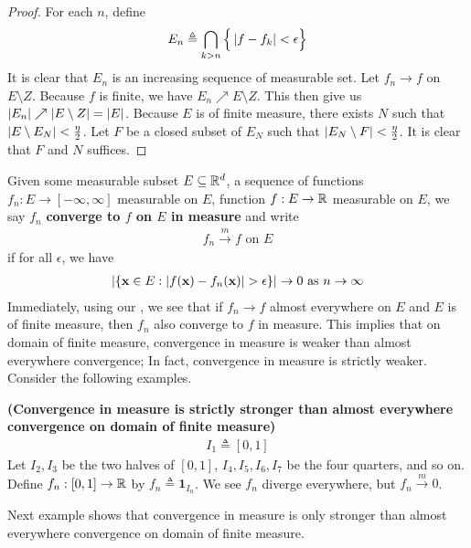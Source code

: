 \documentclass{report}
\begin{document}
\begin{proof}
For each $n$, define 
\begin{align*}
E_n \triangleq \bigcap_{k>n}\Big\{ \left|f-f_k\right|<\epsilon  \Big\}
\end{align*}
It is clear that $E_n$ is an increasing sequence of measurable set. Let $f_n \to f$ on $E\setminus Z$. Because  $f$ is finite, we have  $E_n\nearrow E\setminus Z$. This then give us $\left|E_n\right|\nearrow \left|E\setminus Z\right|=\left|E\right|$. Because $E$ is of finite measure, there exists $N$ such that  $\left|E\setminus E_{N}\right|< \frac{\eta }{2}$. Let $F$ be a closed subset of  $E_{N}$ such that $\left|E_{N}\setminus F\right|< \frac{\eta }{2}$. It is clear that $F$ and  $N$ suffices.
\end{proof}
\begin{mdframed}
Given some measurable subset $E\subseteq \mathbb{R}^d$, a sequence of functions $f_n:E\rightarrow [-\infty,\infty]$ measurable on $E$, function $f:E\rightarrow \mathbb{R}$ measurable on $E$, we say $f_n$ \textbf{converge to $f$ on $E$ in measure} and write 
\begin{align*}
f_n \overset{m}{\to}f\text{ on }E
\end{align*}
if for all $\epsilon $, we have 
\begin{align*}
\abso{\set{\textbf{x}\in E: \abso{f(\textbf{x})-f_n(\textbf{x})}>\epsilon }}\to 0\text{ as }n\to \infty
\end{align*}
Immediately, using our , we see that if $f_n\to f$ almost everywhere on $E$ and $E$ is of finite measure, then $f_n$ also converge to $f$ in measure. This implies that on domain of finite measure, convergence in measure is weaker than almost everywhere convergence; In fact, convergence in measure is strictly weaker. Consider the following examples. 
\end{mdframed}
\begin{Example}{\textbf{(Convergence in measure is strictly stronger than almost everywhere convergence on domain of finite measure)}}{}
\begin{align*}
I_1\triangleq [0,1]
\end{align*}
Let $I_2,I_3$ be the two halves of $[0,1]$, $I_4,I_5,I_6,I_7$ be the four quarters, and so on. Define  $f_n:[0,1]\rightarrow \mathbb{R}$ by $f_n\triangleq \textbf{1}_I_n$. We see $f_n$ diverge everywhere, but $f_n\overset{m}{\to}0$. 
\end{Example}
\begin{mdframed}
Next example shows that convergence in measure is only stronger than almost everywhere convergence on domain of finite measure.  
\end{mdframed}
\end{document}
